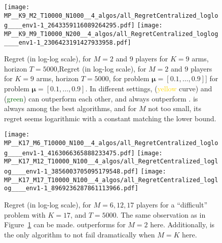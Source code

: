 \begin{figure}[!h]
    \centering
        \texttt{[image: MP\_\_K9\_M2\_T10000\_N1000\_\_4\_algos/all\_RegretCentralized\_loglog\_\_\_\_env1-1\_2643359116089264295.pdf]}
        \texttt{[image: MP\_\_K9\_M9\_T10000\_N200\_\_4\_algos/all\_RegretCentralized\_loglog\_\_\_\_env1-1\_2306423191427933958.pdf]}
    \caption[Regret for $M=2$ and $9$ players for $K=9$ arms, horizon $T=5000$, for a fixed problem]{Regret (in log-log scale), for $M=2$ and $9$ players for $K=9$ arms, horizon $T=5000$,Regret (in log-log scale), for $M=2$ and $9$ players for $K=9$ arms, horizon $T=5000$, for problem $\boldsymbol{\mu}=[0.1,\dots,0.9]$] for problem $\boldsymbol{\mu}=[0.1,\dots,0.9]$. In different settings, \RandTopM{} (\textcolor{gold}{yellow} curve) and \Selfish{} (\textcolor{darkgreen}{green}) can outperform each other, and always outperform \rhoRand. \MCTopM{} is always among the best algorithms, and for $M$ not too small, its regret seems logarithmic with a constant matching the lower bound.}
    \label{fig:5:MP__K9_M2-6-9_T10000_N200__4_algos}
\end{figure}


\begin{figure}[!h]
    \centering
        \texttt{[image: MP\_\_K17\_M6\_T10000\_N100\_\_4\_algos/all\_RegretCentralized\_loglog\_\_\_\_env1-1\_4163066365888233475.pdf]}
        \texttt{[image: MP\_\_K17\_M12\_T10000\_N100\_\_4\_algos/all\_RegretCentralized\_loglog\_\_\_\_env1-1\_3856003705095179548.pdf]}
        \texttt{[image: MP\_\_K17\_M17\_T10000\_N100\_\_4\_algos/all\_RegretCentralized\_loglog\_\_\_\_env1-1\_8969236287861113966.pdf]}
    \caption[Regret for $M=6, 12, 17$ players for a ``difficult'' problem with $K=17$, and $T=5000$]{Regret (in log-log scale), for $M=6, 12, 17$ players for a ``difficult'' problem with $K=17$, and $T=5000$. The same observation as in Figure~\ref{fig:5:MP__K9_M2-6-9_T10000_N200__4_algos} can be made. \Selfish{} outperforms \MCTopM{} for $M=2$ here. Additionally, \MCTopM{} is the only algorithm to not fail dramatically when $M=K$ here.}
    \label{fig:5:MP__K17_M6-12-17_T10000_N100__4_algos}
\end{figure}


